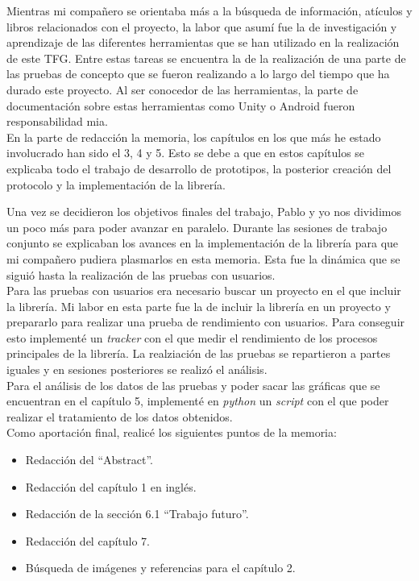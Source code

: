 Mientras mi compa\~nero se orientaba m\'as a la b\'usqueda de informaci\'on, at\'iculos y libros relacionados con el proyecto, la labor que asum\'i fue la de investigaci\'on y aprendizaje de las diferentes herramientas que se han utilizado en la realizaci\'on de este TFG. Entre estas tareas se encuentra la de la realizaci\'on de una parte de las pruebas de concepto que se fueron realizando a lo largo del tiempo que ha durado este proyecto. Al ser conocedor de las herramientas, la parte de documentaci\'on sobre estas herramientas como Unity o Android fueron responsabilidad mia.\\

En la parte de redacci\'on la memoria, los cap\'itulos en los que m\'as he estado involucrado han sido el 3, 4 y 5. Esto se debe a que en estos cap\'itulos se explicaba todo el trabajo de desarrollo de prototipos, la posterior creaci\'on del protocolo y la implementaci\'on de la librer\'ia.

Una vez se decidieron los objetivos finales del trabajo, Pablo y yo nos dividimos un poco m\'as para poder avanzar en paralelo. Durante las sesiones de trabajo conjunto se explicaban los avances en la implementaci\'on de la librer\'ia para que mi compa\~nero pudiera plasmarlos en esta memoria. Esta fue la din\'amica que se sigui\'o hasta la realizaci\'on de las pruebas con usuarios.\\

Para las pruebas con usuarios era necesario buscar un proyecto en el que incluir la librer\'ia. Mi labor en esta parte fue la de incluir la librer\'ia en un proyecto y prepararlo para realizar una prueba de rendimiento con usuarios. Para conseguir esto implement\'e un \textit{tracker} con el que medir el rendimiento de los procesos principales de la librer\'ia. La realziaci\'on de las pruebas se repartieron a partes iguales y en sesiones posteriores se realiz\'o el an\'alisis. \\

Para el an\'alisis de los datos de las pruebas y poder sacar las gr\'aficas que se encuentran en el cap\'itulo 5, implement\'e en \textit{python} un \textit{script} con el que poder realizar el tratamiento de los datos obtenidos.\\

Como aportaci\'on final, realic\'e los siguientes  puntos de la memoria:
\begin{itemize}
  \item  Redacci\'on del ``Abstract''.
  \item Redacci\'on del cap\'itulo 1 en ingl\'es.
\item Redacci\'on de la secci\'on 6.1 ``Trabajo futuro''.
\item Redacci\'on del cap\'itulo 7.
\item B\'usqueda de im\'agenes y referencias para el cap\'itulo 2.
\end{itemize}